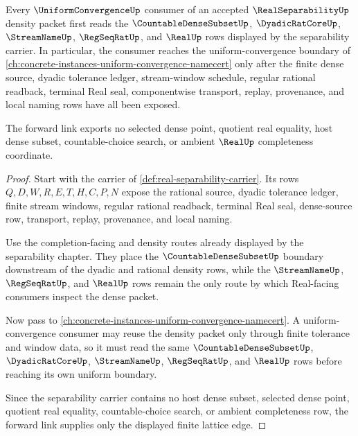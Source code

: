 \begin{lemma}
\label{lem:real-separability-uniform-convergence-forward-link}
Every $\UniformConvergenceUp$ consumer of an accepted $\RealSeparabilityUp$ density packet first reads the $\CountableDenseSubsetUp$, $\DyadicRatCoreUp$, $\StreamNameUp$, $\RegSeqRatUp$, and $\RealUp$ rows displayed by the separability carrier. In particular, the consumer reaches the uniform-convergence boundary of \autoref{ch:concrete-instances-uniform-convergence-namecert} only after the finite dense source, dyadic tolerance ledger, stream-window schedule, regular rational readback, terminal Real seal, componentwise transport, replay, provenance, and local naming rows have all been exposed.

The forward link exports no selected dense point, quotient real equality, host dense subset, countable-choice search, or ambient $\RealUp$ completeness coordinate.
\end{lemma}
\begin{proof}
Start with the carrier of \autoref{def:real-separability-carrier}. Its rows $Q,D,W,R,E,T,H,C,P,N$ expose the rational source, dyadic tolerance ledger, finite stream windows, regular rational readback, terminal Real seal, dense-source row, transport, replay, provenance, and local naming.

Use the completion-facing and density routes already displayed by the separability chapter. They place the $\CountableDenseSubsetUp$ boundary downstream of the dyadic and rational density rows, while the $\StreamNameUp$, $\RegSeqRatUp$, and $\RealUp$ rows remain the only route by which Real-facing consumers inspect the dense packet.

Now pass to \autoref{ch:concrete-instances-uniform-convergence-namecert}. A uniform-convergence consumer may reuse the density packet only through finite tolerance and window data, so it must read the same $\CountableDenseSubsetUp$, $\DyadicRatCoreUp$, $\StreamNameUp$, $\RegSeqRatUp$, and $\RealUp$ rows before reaching its own uniform boundary.

Since the separability carrier contains no host dense subset, selected dense point, quotient real equality, countable-choice search, or ambient completeness row, the forward link supplies only the displayed finite lattice edge.
\end{proof}
